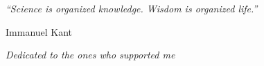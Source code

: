 \documentclass[a4paper, 11pt, twoside]{book}  %
\numberwithin{equation}{section}
\begin{document}
\dominitoc
\frontmatter      %

\pagestyle{empty}  %

%


\cleardoublepage

\null\vfill
\begin{minipage}{5in}
  \textit{``Science is organized knowledge. Wisdom is organized life.''}
\end{minipage}

\begin{flushright}
Immanuel Kant
\end{flushright}

\vfill\vfill\null
\cleardoublepage  %



\cleardoublepage
 


\cleardoublepage
 

\pagestyle{fancy}
\fancyhead{}  %
\fancyhead[RE, LO]{\thepage}
\fancyhead[RO]{\rightmark}
\fancyhead[LE]{\leftmark}
\cfoot{}

\adjustmtc
\setcounter{tocdepth}{1}
\tableofcontents  %

\listoffigures  {} \mtcaddchapter%

\listoftables  {}  \mtcaddchapter   %






\cleardoublepage
\pagestyle{empty}
\null\vfil
\begin{center}{\Large \sl Dedicated to the ones who supported me}\end{center}
\vfil\null
\cleardoublepage
{}  %

\end{document}
